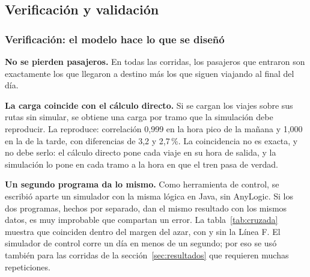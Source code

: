 \documentclass{article}
\begin{document}
\subsection{Verificación y validación}
\label{sec:verificacion}

\subsubsection{Verificación: el modelo hace lo que se diseñó}

\textbf{No se pierden pasajeros.} En todas las corridas, los pasajeros que entraron son exactamente los que
llegaron a destino más los que siguen viajando al final del día.

\textbf{La carga coincide con el cálculo directo.} Si se cargan los viajes sobre sus rutas sin simular, se
obtiene una carga por tramo que la simulación debe reproducir. La reproduce: correlación 0,999 en la hora pico
de la mañana y 1,000 en la de la tarde, con diferencias de 3,2 y 2,7\,\%. La coincidencia no es exacta, y no
debe serlo: el cálculo directo pone cada viaje en su hora de salida, y la simulación lo pone en cada tramo a la
hora en que el tren pasa de verdad.

\textbf{Un segundo programa da lo mismo.} Como herramienta de control, se escribió aparte un simulador con la
misma lógica en Java, sin AnyLogic. Si los dos programas, hechos por separado, dan el mismo resultado con los
mismos datos, es muy improbable que compartan un error. La tabla~\ref{tab:cruzada} muestra que coinciden
dentro del margen del azar, con y sin la Línea F. El simulador de control corre un día en menos de un
segundo; por eso se usó también para las corridas de la sección~\ref{sec:resultados} que requieren muchas
repeticiones.
\end{document}

